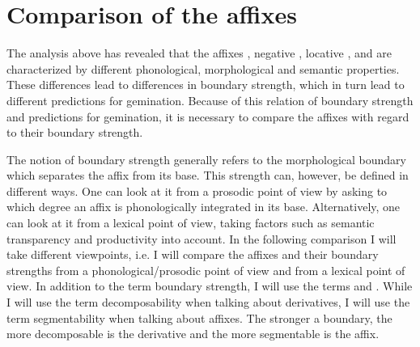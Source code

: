 \section{Comparison of the affixes}\label{comparison affixes}

The analysis above has revealed that the affixes , negative , locative ,  and  are characterized by different phonological, morphological and semantic properties. These differences lead to differences in boundary strength, which in turn lead to different predictions for gemination.  Because of this relation of boundary strength and predictions for gemination, it is necessary to compare the affixes with regard to their boundary strength. 

The notion of boundary strength generally refers to the morphological boundary which separates the affix from its base. This strength can, however, be defined in different ways. One can look at it from a prosodic point of view by asking to which degree an affix is phonologically integrated in its base. Alternatively, one can look at it from a lexical point of view, taking factors such as semantic transparency and productivity into account. In the following comparison I will take different viewpoints, i.e. I will compare the affixes and their boundary strengths from a phonological/prosodic point of view and  from a lexical point of view. In addition to the term boundary strength, I will use the terms  and . While I will use the term decomposability when talking about derivatives, I will use the term segmentability when talking about affixes. The stronger a boundary, the more decomposable is the derivative and the more segmentable is the affix.







